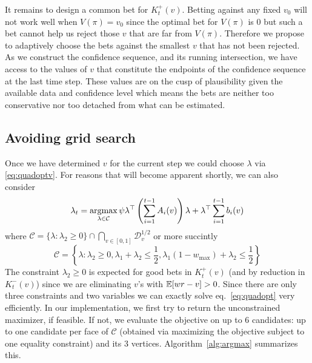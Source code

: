 It remains to design a common bet for $K_t^{+}(v)$.  Betting against any fixed
$v_0$ will not work well when $V(\pi)=v_0$ since the optimal bet for $V(\pi)$
is 0 but such a bet cannot help us reject those $v$ that are far from $V(\pi)$.
Therefore we propose to adaptively choose the bets against the smallest $v$
that has not been rejected. As we construct the confidence sequence, and its
running intersection, we have access to the values of $v$ that constitute the
endpoints of the confidence sequence at the last time step. These values are on
the cusp of plausibility given the available data and confidence level which
means the bets are neither too conservative nor too detached from what can be
estimated.

\subsection{Avoiding grid search}
\label{sec:avoid-grid}
Once we have determined $v$ for the current step we could choose $\lambda$ via
\eqref{eq:quadoptv}. For reasons that will become apparent shortly, we can also
consider
\begin{equation}
\lambda_t = \operatorname*{argmax}_{\lambda \in \mathcal{C}}
\psi  \lambda^\top \left(\sum_{i=1}^{t-1} A_i(v)\right) \lambda 
+ \lambda^\top \sum_{i=1}^{t-1} b_i(v)
\label{eq:quadopt}
\end{equation}
where $\mathcal{C}=\{\lambda: \lambda_2 \geq 0\}\cap \bigcap_{v\in [0,1]} \mathcal{D}_v^{1/2}$
or more succintly
$$
\mathcal{C} = \left\{\lambda: \lambda_2\geq 0, 
\lambda_1 + \lambda_2 \leq \frac{1}{2},
\lambda_1 \left(1-w_{\max}\right) + \lambda_2 \leq  \frac{1}{2}
\right\}
$$
The constraint $\lambda_2\geq 0$ is expected for good bets in $K_t^+(v)$ (and
by reduction in $K_t^-(v)$) since we are eliminating $v$'s with $\mathbb{E}[wr-v]>0$.
Since there are only three constraints and two variables we can exactly solve
eq.~\eqref{eq:quadopt} very efficiently. In our implementation, we first try to
return the unconstrained maximizer, if feasible.  If not, we evaluate the
objective on up to 6 candidates: up to one candidate per face of $\mathcal{C}$
(obtained via maximizing the objective subject to one equality constraint) and
its 3 vertices. Algorithm~\ref{alg:argmax} summarizes this.

